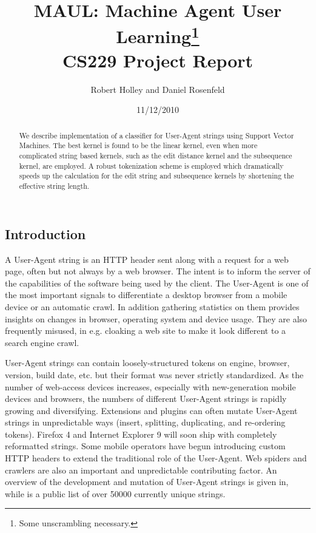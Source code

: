 \documentclass[10pt]{article}
\title{MAUL: Machine Agent User Learning\footnote{Some unscrambling necessary.}\\ CS229 Project Report }
\author{Robert Holley and Daniel Rosenfeld}
\date{11/12/2010}
\begin{document}
\maketitle
\begin{abstract}
We describe implementation of a classifier for User-Agent strings using Support Vector Machines.  The best kernel is found to be the linear kernel, even when more complicated string based kernels, such as the edit distance kernel and the subsequence kernel, are employed.  A robust tokenization scheme is employed which dramatically speeds up the calculation for the edit string and subsequence kernels by shortening the effective string length. 
\end{abstract}
\begin{multicols}{2}

\section{Introduction}
A User-Agent string is an HTTP header sent along with a request for a web page, often but not always by a web browser.\cite{httprfc} The intent is to inform the server
of the capabilities of the software being used by the client. The User-Agent is
one of the most important signals to differentiate a desktop browser from a
mobile device or an automatic crawl. In addition gathering statistics on them
provides insights on changes in browser, operating system and device usage. They
are also frequently misused, in e.g. cloaking a web site to make it look
different to a search engine crawl.

User-Agent strings can contain loosely-structured tokens on engine, browser,
version, build date, etc. but their format was never strictly standardized.\cite{httprfc}
As the number of web-access devices increases, especially with new-generation
mobile devices and browsers, the numbers of different User-Agent strings is
rapidly growing and diversifying. Extensions and plugins can often mutate
User-Agent strings in unpredictable ways (insert, splitting, duplicating, and
re-ordering tokens). Firefox 4 and Internet Explorer 9 will soon ship with
completely reformatted strings. Some mobile operators have begun introducing
custom HTTP headers to extend the traditional role of the User-Agent.\cite{mobile} Web spiders and crawlers are also an important and unpredictable contributing factor.
An overview of the development and mutation of User-Agent strings is given in,\cite{history} while \cite{uatracker} is a public list of over 50000 currently unique strings.


\end{multicols}
\end{document}
